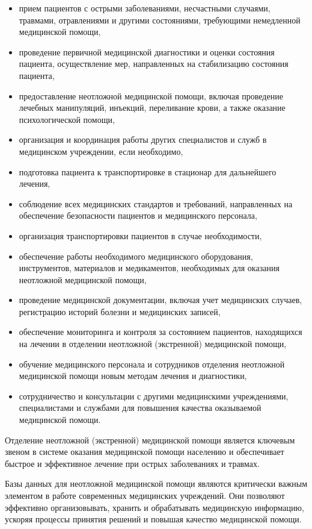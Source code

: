 \begin{itemize}
    \item прием пациентов с острыми заболеваниями, несчастными случаями, травмами, отравлениями и другими состояниями, требующими немедленной медицинской помощи,
    \item проведение первичной медицинской диагностики и оценки состояния пациента, осуществление мер, направленных на стабилизацию состояния пациента,
    \item предоставление неотложной медицинской помощи, включая проведение лечебных манипуляций, инъекций, переливание крови, а также оказание психологической помощи,
    \item организация и координация работы других специалистов и служб в медицинском учреждении, если необходимо,
    \item подготовка пациента к транспортировке в стационар для дальнейшего лечения,
    \item соблюдение всех медицинских стандартов и требований, направленных на обеспечение безопасности пациентов и медицинского персонала,
    \item организация транспортировки пациентов в случае необходимости,
    \item обеспечение работы необходимого медицинского оборудования, инструментов, материалов и медикаментов, необходимых для оказания неотложной медицинской помощи,
    \item проведение медицинской документации, включая учет медицинских случаев, регистрацию историй болезни и медицинских записей,
    \item обеспечение мониторинга и контроля за состоянием пациентов, находящихся на лечении в отделении неотложной (экстренной) медицинской помощи,
    \item обучение медицинского персонала и сотрудников отделения неотложной медицинской помощи новым методам лечения и диагностики,
    \item сотрудничество и консультации с другими медицинскими учреждениями, специалистами и службами для повышения качества оказываемой медицинской помощи.
\end{itemize}

Отделение неотложной (экстренной) медицинской помощи является ключевым звеном в системе оказания медицинской помощи населению и обеспечивает быстрое и эффективное лечение при острых заболеваниях и травмах.

Базы данных для неотложной медицинской помощи являются критически важным элементом в работе современных медицинских учреждений. Они позволяют эффективно организовывать, хранить и обрабатывать медицинскую информацию, ускоряя процессы принятия решений и повышая качество медицинской помощи.

